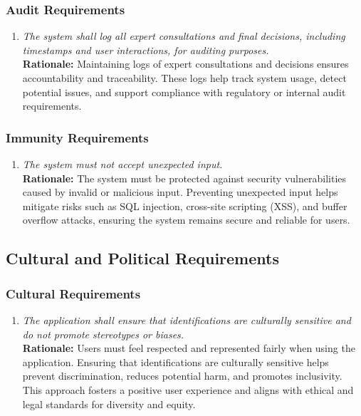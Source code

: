 \documentclass[]{article}
\begin{document}
\subsubsection{Audit Requirements}
\label{ssub:audit_requirements}
\begin{enumerate}[{SR-AU}1. ]
	\item \textit{The system shall log all expert consultations and final decisions, including timestamps and user interactions, for auditing purposes.}
	\\ \textbf{Rationale:} Maintaining logs of expert consultations and decisions ensures accountability and traceability. These logs help track system usage, detect potential issues, and support compliance with regulatory or internal audit requirements.
\end{enumerate}

\subsubsection{Immunity Requirements}
\label{ssub:immunity_requirements}
\begin{enumerate}[{SR-IM}1. ]
	\item \textit{The system must not accept unexpected input.}
	\\ \textbf{Rationale:} The system must be protected against security vulnerabilities caused by invalid or malicious input. Preventing unexpected input helps mitigate risks such as SQL injection, cross-site scripting (XSS), and buffer overflow attacks, ensuring the system remains secure and reliable for users.
\end{enumerate}


\subsection{Cultural and Political Requirements}
\label{sub:cultural_and_political_requirements}

\subsubsection{Cultural Requirements}
\label{ssub:cultural_requirements}
\begin{enumerate}[{CP-C}1. ]
	\item \textit{The application shall ensure that identifications are culturally sensitive and do not promote stereotypes or biases.}
	\\ \textbf{Rationale:} Users must feel respected and represented fairly when using the application. Ensuring that identifications are culturally sensitive helps prevent discrimination, reduces potential harm, and promotes inclusivity. This approach fosters a positive user experience and aligns with ethical and legal standards for diversity and equity.
\end{enumerate}
\end{document}
